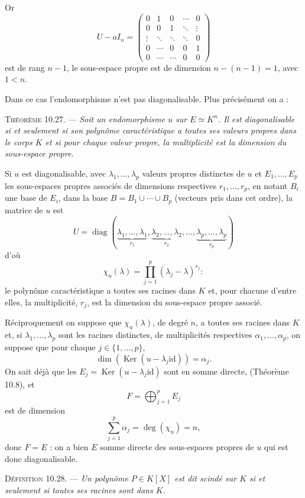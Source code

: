 Or
\[
U-aI_n=
\begin{pmatrix}
0&1&0&\cdots&0\\
0&0&1&\ddots&\vdots\\
\vdots&\ddots&\ddots&\ddots&0\\
0&\cdots&0&0&1\\
0&\cdots&\cdots&0&0
\end{pmatrix}
\]
est de rang $n-1$, le sous-espace propre est de dimension $n-(n-1)=1$, avec $1<n$.

Dans ce cas l'endomorphisme n'est pas diagonalisable. Plus précisément on a :

\medskip\noindent\textsc{Théorème 10.27.} --- \emph{Soit un endomorphisme $u$ sur $E\simeq K^n$. Il est diagonalisable si et seulement si son polynôme caractéristique a toutes ses valeurs propres dans le corps $K$ et si pour chaque valeur propre, la multiplicité est la dimension du sous-espace propre.}

Si $u$ est diagonalisable, avec $\lambda_1,\ldots,\lambda_p$ valeurs propres distinctes de $u$ et $E_1,\ldots,E_p$ les sous-espaces propres associés de dimensions respectives $r_1,\ldots,r_p$, en notant $B_i$ une base de $E_i$, dans la base $B=B_1\cup\cdots\cup B_p$ (vecteurs pris dans cet ordre), la matrice de $u$ est
\[
U=\operatorname{diag}(\underbrace{\lambda_1,\ldots,\lambda_1}_{r_1},
\underbrace{\lambda_2,\ldots,\lambda_2}_{r_2},\ldots,
\underbrace{\lambda_p,\ldots,\lambda_p}_{r_p})
\]
d'où
\[
\chi_u(\lambda)=\prod_{j=1}^p(\lambda_j-\lambda)^{r_j}:
\]
le polynôme caractéristique a toutes ses racines dans $K$ et, pour chacune d'entre elles, la multiplicité, $r_j$, est la dimension du sous-espace propre associé.

Réciproquement on suppose que $\chi_u(\lambda)$, de degré $n$, a toutes ses racines dans $K$ et, si $\lambda_1,\ldots,\lambda_p$ sont les racines distinctes, de multiplicités respectives $\alpha_1,\ldots,\alpha_p$, on suppose que pour chaque $j\in\{1,\ldots,p\}$,
\[
\dim(\operatorname{Ker}(u-\lambda_j\mathrm{id}))=\alpha_j.
\]
On sait déjà que les $E_j=\operatorname{Ker}(u-\lambda_j\mathrm{id})$ sont en somme directe, (Théorème 10.8), et
\[
F=\bigoplus_{j=1}^pE_j
\]
est de dimension
\[
\sum_{j=1}^p\alpha_j=\deg(\chi_u)=n,
\]
donc $F=E$ : on a bien $E$ somme directe des sous-espaces propres de $u$ qui est donc diagonalisable. \bookend

\medskip\noindent\textsc{Définition 10.28.} --- \emph{Un polynôme $P\in K[X]$ est dit scindé sur $K$ si et seulement si toutes ses racines sont dans $K$.}

